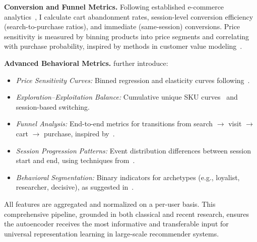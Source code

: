 \documentclass[sigconf]{acmart}
\begin{document}
\textbf{Conversion and Funnel Metrics.}
Following established e-commerce analytics~\cite{Covington2016, Zhou2020S3Rec}, I calculate cart abandonment rates, session-level conversion efficiency (search-to-purchase ratios), and immediate (same-session) conversions. Price sensitivity is measured by binning products into price segments and correlating with purchase probability, inspired by methods in customer value modeling~\cite{Krasnova2018}.

\textbf{Advanced Behavioral Metrics.}
further introduce:
\begin{itemize}
    \item \textit{Price Sensitivity Curves:} Binned regression and elasticity curves following~\cite{Krasnova2018}.
    \item \textit{Exploration–Exploitation Balance:} Cumulative unique SKU curves~\cite{Cui2018} and session-based switching.
    \item \textit{Funnel Analysis:} End-to-end metrics for transitions from search $\rightarrow$ visit $\rightarrow$ cart $\rightarrow$ purchase, inspired by~\cite{Covington2016}.
    \item \textit{Session Progression Patterns:} Event distribution differences between session start and end, using techniques from~\cite{Quadrana2017}.
    \item \textit{Behavioral Segmentation:} Binary indicators for archetypes (e.g., loyalist, researcher, decisive), as suggested in~\cite{Christoffel2022}.
\end{itemize}

All features are aggregated and normalized on a per-user basis. This comprehensive pipeline, grounded in both classical and recent research, ensures the autoencoder receives the most informative and transferable input for universal representation learning in large-scale recommender systems.
\end{document}
